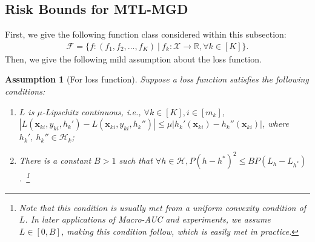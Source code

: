 \documentclass{article}
\def\sR{\mathbb{R}}
\def\vx{{\mathbf{x}}}
\def\eE{\mathbb{E}}
\DeclareMathOperator*{\argmin}{argmin}
\newtheorem{assumption}{Assumption}
\begin{document}
\subsection{Risk Bounds for MTL-MGD}
\label{sec-mtl:risk-bound-for-mtl}
First, we give the following function class considered within this subsection:
\begin{align}
\label{eq:function_class_f}
    \mathcal{F} = \{ f: (f_1,f_2,\dots,f_K)~|~f_k: \mathcal{X} \rightarrow \sR, \forall k \in [K] \}.
\end{align}
Then, we give the following mild assumption about the loss function.
\begin{assumption}[For loss function] 
\label{thm:assump2}
Suppose a loss function satisfies the following conditions:
\begin{enumerate}[(1)]
\setlength\itemsep{-0.2pt}
    \item $L$ is $\mu $-Lipschitz continuous, i.e., $\forall k \in [K], i \in [m_k]$, $|L(\vx_{ki},y_{ki},h_k')-L(\vx_{ki},y_{ki},h_k'')| \leq \mu |h_k'(\vx_{ki})-h_k''(\vx_{ki})|$, 
    where $h_k', ~h_k'' \in \mathcal{H}_k$; 
    \item There is a constant $B > 1$ such that $\forall h \in \mathcal{H}, P(h-h^*)^2 \leq BP(L_h-L_{h^*})$.~\footnote{Note that this condition is usually met from a uniform convexity condition of $L$. In later applications of Macro-AUC and experiments, we assume $L \in [0, B]$, making this condition follow, which is easily met in practice. }
\end{enumerate} 
\end{assumption}
\end{document}
